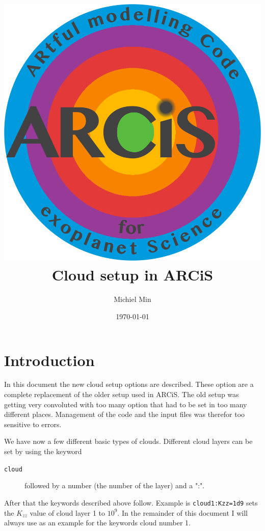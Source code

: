 \documentclass[12pt]{article}
\begin{document}
\title{\includegraphics[width=0.9\hsize]{ARCiS}\\Cloud setup in ARCiS}
\author{Michiel Min}
\date{\today}
\maketitle

\section{Introduction}

In this document the new cloud setup options are described. These option are a complete replacement of the older setup used in ARCiS. The old setup was getting very convoluted with too many option that had to be set in too many different places. Management of the code and the input files was therefor too sensitive to errors.

We have now a few different basic types of clouds. Different cloud layers can be set by using the keyword
\begin{description}
\item[\texttt{cloud}]
followed by a number (the number of the layer) and a ":".
\end{description}
After that the keywords described above follow. Example is \texttt{cloud1:Kzz=1d9} sets the $K_{zz}$ value of cloud layer 1 to $10^9$.
In the remainder of this document I will always use as an example for the keywords cloud number 1.
\end{document}
